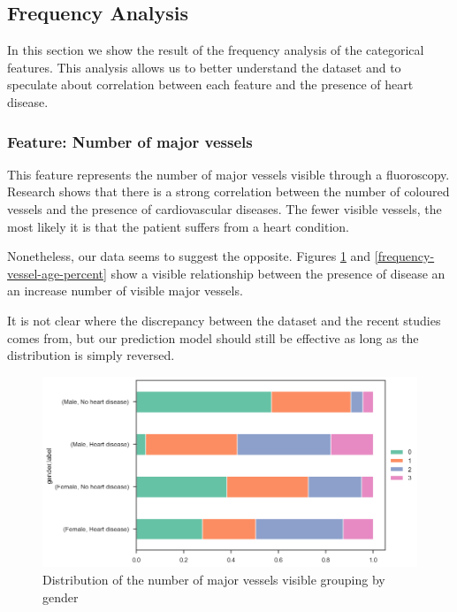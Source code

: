 \subsection{Frequency Analysis}

In this section we show the result of the frequency analysis of the categorical features. This analysis allows us to
better understand the dataset and to speculate about correlation between each feature and the presence of
heart disease.

\subsubsection{Feature: Number of major vessels}

This feature represents the number of major vessels visible through a fluoroscopy. Research \cite{Fluoroscopy} shows that
there is a strong correlation between the number of coloured vessels and the presence of cardiovascular diseases.
The fewer visible vessels, the most likely it is that the patient suffers from a heart condition.

Nonetheless, our data seems to suggest the opposite. Figures \ref{frequency-vessel-gender-percent} and \ref{frequency-vessel-age-percent}
show a visible relationship between the presence of disease an an increase number of visible major vessels.

It is not clear where the discrepancy between the dataset and the recent studies comes from, but our prediction
model should still be effective as long as the distribution is simply reversed.

\begin{figure}
    \caption{Distribution of the number of major vessels visible grouping by gender}\label{frequency-vessel-gender-percent}
    \centering
    \includegraphics[width=\linewidth]{media/frequency-01-gender-vessels.png}
\end{figure}

